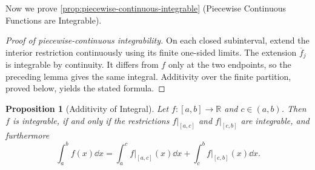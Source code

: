 \documentclass[11pt]{article}
\numberwithin{equation}{section}
\newtheorem{proposition}[theorem]{Proposition}
\theoremstyle{definition}
\theoremstyle{remark}
\newcommand{\pqty}[1]{\left(#1\right)}
\newcommand{\ccintv}[2]{[#1,#2]}
\newcommand{\oointv}[2]{(#1,#2)}
\newcommand{\functiondomain}[3]{#1:#2\to #3}
\newcommand{\RR}{\mathbb R}
\newcommand{\rightbar}[1]{\left.#1\right|}
\begin{document}
Now we prove \autoref{prop:piecewise-continuous-integrable} (Piecewise Continuous Functions are Integrable).

\begin{proof}[Proof of piecewise-continuous integrability]
On each closed subinterval, extend the interior restriction continuously using
its finite one-sided limits. The extension \(\overline f_j\) is integrable by
continuity. It differs from \(f\) only at the two endpoints, so the preceding
lemma gives the same integral. Additivity over the finite partition, proved
below, yields the stated formula.
\end{proof}

\begin{proposition}[Additivity of Integral]\label{analysis-unit-0155}
    \label{prop:additivity-integral}%
    Let \(\functiondomain{f}{\ccintv{a}{b}}{\RR}\) and \(c \in \oointv{a}{b}\). Then \(f\) is integrable, if and only if the restrictions \(\rightbar{f}_{\ccintv{a}{c}}\) and \(\rightbar{f}_{\ccintv{c}{b}}\) are integrable, and furthermore
    \[
        \int_{a}^{b} f\pqty{x} \dd{x} = \int_{a}^{c} \rightbar{f}_{\ccintv{a}{c}} \pqty{x} \dd{x} + \int_{c}^{b} \rightbar{f}_{\ccintv{c}{b}} \pqty{x} \dd{x}.
    \]
\end{proposition}
\end{document}
